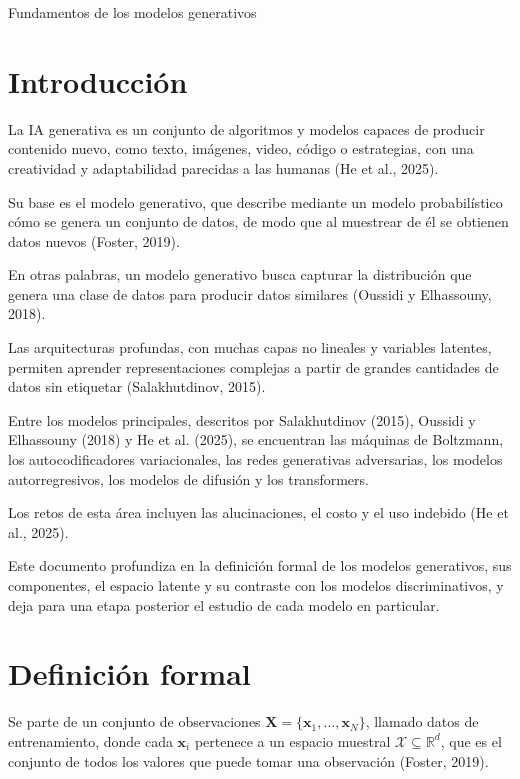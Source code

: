 \documentclass[11pt,letterpaper]{article}
\theoremstyle{definition}
\newcommand{\bx}{\mathbf{x}}
\newcommand{\bX}{\mathbf{X}}
\begin{document}
\begin{center}
  {\LARGE Fundamentos de los modelos generativos}
\end{center}
\vspace{0.5em}

\section{Introducción}

La IA generativa es un conjunto de algoritmos y modelos capaces de producir contenido nuevo, como texto, imágenes, video, código o estrategias, con una creatividad y adaptabilidad parecidas a las humanas (He et al., 2025).

Su base es el modelo generativo, que describe mediante un modelo probabilístico cómo se genera un conjunto de datos, de modo que al muestrear de él se obtienen datos nuevos (Foster, 2019).

En otras palabras, un modelo generativo busca capturar la distribución que genera una clase de datos para producir datos similares (Oussidi y Elhassouny, 2018).

Las arquitecturas profundas, con muchas capas no lineales y variables latentes, permiten aprender representaciones complejas a partir de grandes cantidades de datos sin etiquetar (Salakhutdinov, 2015).

Entre los modelos principales, descritos por Salakhutdinov (2015), Oussidi y Elhassouny (2018) y He et al. (2025), se encuentran las máquinas de Boltzmann, los autocodificadores variacionales, las redes generativas adversarias, los modelos autorregresivos, los modelos de difusión y los transformers.

Los retos de esta área incluyen las alucinaciones, el costo y el uso indebido (He et al., 2025).

Este documento profundiza en la definición formal de los modelos generativos, sus componentes, el espacio latente y su contraste con los modelos discriminativos, y deja para una etapa posterior el estudio de cada modelo en particular.

\section{Definición formal}

Se parte de un conjunto de observaciones $\bX = \{\bx_1, \dots, \bx_N\}$, llamado datos de entrenamiento, donde cada $\bx_i$ pertenece a un espacio muestral $\mathcal{X} \subseteq \mathbb{R}^d$, que es el conjunto de todos los valores que puede tomar una observación (Foster, 2019).
\end{document}
